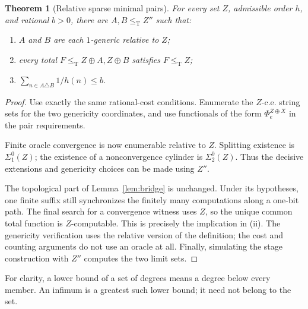 \documentclass[11pt,a4paper]{article}
\newcommand{\leT}{\leq_{\mathrm T}}
\newtheorem{theorem}{Theorem}[section]
\theoremstyle{definition}
\theoremstyle{remark}
\begin{document}
\begin{theorem}[Relative sparse minimal pairs]\label{thm:relative}
For every set $Z$, admissible order $h$, and rational $b>0$, there are $A,B\leT Z''$ such that:
\begin{enumerate}[label=(\roman*)]
\item $A$ and $B$ are each $1$-generic relative to $Z$;
\item every total $F\leT Z\oplus A,Z\oplus B$ satisfies $F\leT Z$;
\item $\sum_{n\in A\triangle B}1/h(n)\leq b$.
\end{enumerate}
\end{theorem}
\begin{proof}
Use exactly the same rational-cost conditions. Enumerate the $Z$-c.e. string sets for the two genericity coordinates, and use functionals of the form $\Phi_e^{Z\oplus X}$ in the pair requirements.

Finite oracle convergence is now enumerable relative to $Z$. Splitting existence is $\Sigma^0_1(Z)$; the existence of a nonconvergence cylinder is $\Sigma^0_2(Z)$. Thus the decisive extensions and genericity choices can be made using $Z''$.

The topological part of Lemma~\ref{lem:bridge} is unchanged. Under its hypotheses, one finite suffix still synchronizes the finitely many computations along a one-bit path. The final search for a convergence witness uses $Z$, so the unique common total function is $Z$-computable. This is precisely the implication in (ii). The genericity verification uses the relative version of the definition; the cost and counting arguments do not use an oracle at all. Finally, simulating the stage construction with $Z''$ computes the two limit sets.
\end{proof}

For clarity, a lower bound of a set of degrees means a degree below every member. An infimum is a greatest such lower bound; it need not belong to the set.
\end{document}
